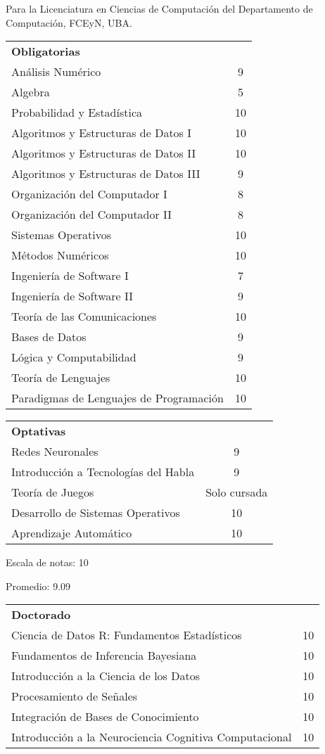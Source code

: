 \documentclass[a4paper,10pt]{article}
\begin{document}
Para la Licenciatura en Ciencias de Computación del Departamento de
Computación, FCEyN, UBA.

\begin{tabular}{ l c }

\textbf{Obligatorias} \smallskip  & \\ 
Análisis Numérico & 9\\
Algebra & 5\\
Probabilidad y Estadística & 10\\
Algoritmos y Estructuras de Datos I & 10\\
Algoritmos y Estructuras de Datos II & 10\\
Algoritmos y Estructuras de Datos III & 9\\
Organización del Computador I & 8\\
Organización del Computador II & 8\\
Sistemas Operativos & 10\\
Métodos Numéricos & 10\\
Ingeniería de Software I & 7\\
Ingeniería de Software II & 9\\
Teoría de las Comunicaciones & 10\\
Bases de Datos & 9\\
Lógica y Computabilidad & 9\\
Teoría de Lenguajes & 10\\
Paradigmas de Lenguajes de Programación & 10\\
\end{tabular}

\medskip
\begin{tabular}{l c}
\textbf{Optativas} \smallskip & \\
Redes Neuronales & 9\\
Introducción a Tecnologías del Habla & 9\\
Teoría de Juegos & Solo cursada\\
Desarrollo de Sistemas Operativos & 10\\
Aprendizaje Automático & 10\\
\end{tabular}
\bigskip

Escala de notas: 10

Promedio: 9.09

\bigskip
\begin{tabular}{l c}
\textbf{Doctorado} \smallskip & \\
Ciencia de Datos R: Fundamentos Estadísticos & 10 \\
Fundamentos de Inferencia Bayesiana & 10 \\
Introducción a la Ciencia de los Datos & 10 \\ 
Procesamiento de Señales & 10 \\
Integración de Bases de Conocimiento & 10 \\
Introducción a la Neurociencia Cognitiva Computacional & 10 \\
\end{tabular}
\end{document}
